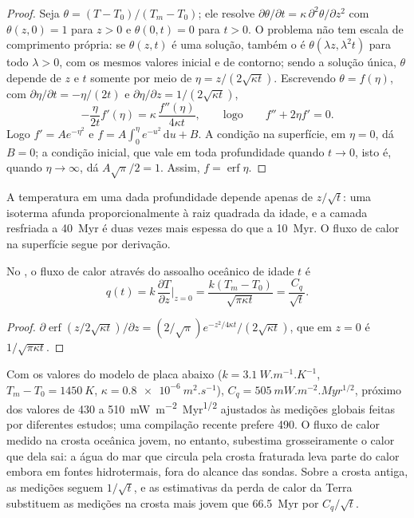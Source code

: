 \begin{proof}
Seja $\theta = (T - T_0)/(T_m - T_0)$; ele resolve $\partial\theta/\partial t =
\kappa\,\partial^2\theta/\partial z^2$ com $\theta(z, 0) = 1$ para $z > 0$ e
$\theta(0, t) = 0$ para $t > 0$. O problema não tem escala de comprimento própria:
se $\theta(z, t)$ é uma solução, também o é $\theta(\lambda z, \lambda^2t)$ para todo
$\lambda > 0$, com os mesmos valores inicial e de contorno; sendo a solução
única, $\theta$ depende de $z$ e $t$ somente por meio de $\eta = z/(2\sqrt{\kappa
t})$. Escrevendo $\theta = f(\eta)$, com $\partial\eta/\partial t = -\eta/(2t)$ e
$\partial\eta/\partial z = 1/(2\sqrt{\kappa t})$,
\[
  -\frac{\eta}{2t}f'(\eta) = \kappa\,\frac{f''(\eta)}{4\kappa t},
  \qquad\text{logo}\qquad f'' + 2\eta f' = 0 .
\]
Logo $f' = Ae^{-\eta^2}$ e $f = A\int_0^\eta e^{-u^2}\,\mathrm du + B$. A
condição na superfície, em $\eta = 0$, dá $B = 0$; a condição inicial, que
vale em toda profundidade quando $t \to 0$, isto é, quando $\eta \to \infty$, dá
$A\sqrt\pi/2 = 1$. Assim, $f = \operatorname{erf}\eta$.
\end{proof}

A temperatura em uma dada profundidade depende apenas de $z/\sqrt t$: uma isoterma afunda
proporcionalmente à raiz quadrada da idade, e a camada resfriada a \qty{40}{Myr} é duas
vezes mais espessa do que a \qty{10}{Myr}. O fluxo de calor na superfície segue por derivação.

\begin{proposition}\label{prop:b3:lithosphere-thermal-models:heat-flow}
No , o fluxo de calor através do assoalho oceânico de idade $t$
é
\[
  q(t) = k\,\frac{\partial T}{\partial z}\Big|_{z=0}
  = \frac{k(T_m - T_0)}{\sqrt{\pi\kappa t}} = \frac{C_q}{\sqrt t} .
\]
\end{proposition}

\begin{proof}
$\partial\operatorname{erf}(z/2\sqrt{\kappa t})/\partial z = (2/\sqrt\pi)
e^{-z^2/4\kappa t}/(2\sqrt{\kappa t})$, que em $z = 0$ é $1/\sqrt{\pi\kappa
t}$.
\end{proof}

Com os valores do modelo de placa abaixo ($k = \qty{3.1}{W.m^{-1}.K^{-1}}$,
$T_m - T_0 = \qty{1450}{K}$, $\kappa = \qty{0.8e-6}{m^2.s^{-1}}$), $C_q =
\qty{505}{mW.m^{-2}.Myr^{1/2}}$, próximo dos valores de 430 a
\qty{510}{mW.m^{-2}.Myr^{1/2}} ajustados às medições globais feitas por diferentes
estudos; uma compilação recente prefere \num{490}. O fluxo de calor medido na
crosta oceânica jovem, no entanto, subestima grosseiramente o calor que dela sai:
a água do mar que circula pela crosta fraturada leva parte do calor embora
em fontes hidrotermais, fora do alcance das sondas. Sobre a crosta antiga, as medições
seguem $1/\sqrt t$, e as estimativas da perda de calor da Terra substituem as
medições na crosta mais jovem que \qty{66.5}{Myr} por $C_q/\sqrt t$.


